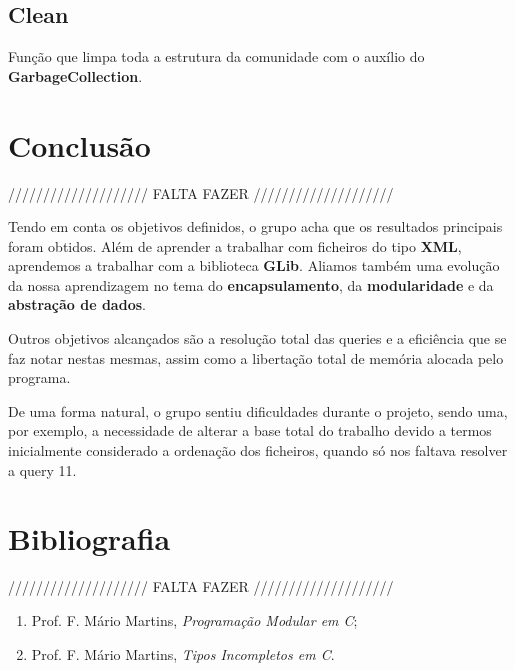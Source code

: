 \documentclass[a4paper]{article}
\begin{document}
\subsection{Clean}


Função que limpa toda a estrutura da comunidade com o auxílio do \textbf{GarbageCollection}.

\section{Conclusão}
\label{sec:conclusao}

//////////////////// FALTA FAZER ////////////////////

Tendo em conta os objetivos definidos, o grupo acha que os resultados 
principais foram obtidos. Além de aprender a trabalhar com ficheiros 
do tipo \textbf{XML}, aprendemos a trabalhar com a biblioteca \textbf{GLib}.
Aliamos também uma evolução da nossa aprendizagem no tema do 
\textbf{encapsulamento}, da \textbf{modularidade} e 
da \textbf{abstração de dados}.

Outros objetivos alcançados são a resolução total das queries e a eficiência
que se faz notar nestas mesmas, assim como a libertação total de memória 
alocada pelo programa.

De uma forma natural, o grupo sentiu dificuldades durante o projeto, sendo 
uma, por exemplo, a necessidade de alterar a base total do trabalho devido
a termos inicialmente considerado a ordenação dos ficheiros, quando só nos
faltava resolver a query 11.

\section{Bibliografia}

//////////////////// FALTA FAZER ////////////////////

\begin{enumerate} 
	\item Prof. F. Mário Martins, \textit{Programação Modular em C};
	\item Prof. F. Mário Martins, \textit{Tipos Incompletos em C}.
\end{enumerate}
\end{document}

